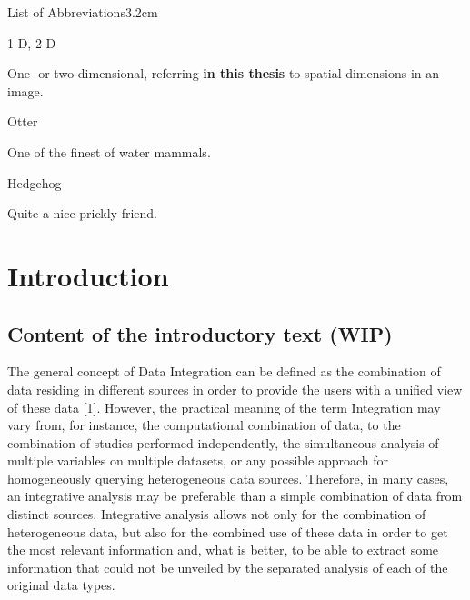 \documentclass[a4paper, nobind]{templates/ociamthesis}
\renewcommand{\chaptermark}[1]{\markboth{\thechapter. #1}{\thechapter. #1}}
\begin{document}
\begin{romanpages}
\listoftables
  \mtcaddchapter
\begin{mclistof}{List of Abbreviations}{3.2cm}

\item[1-D, 2-D]

One- or two-dimensional, referring \textbf{in this thesis} to spatial dimensions in an image.

\item[Otter]

One of the finest of water mammals.

\item[Hedgehog]

Quite a nice prickly friend.

\end{mclistof} 


\end{romanpages}

\flushbottom

\hypertarget{introduction}{%
\chapter{Introduction}\label{introduction}}

\chaptermark{Introduction}

\minitoc 

\hypertarget{content-of-the-introductory-text-wip}{%
\section{Content of the introductory text (WIP)}\label{content-of-the-introductory-text-wip}}

The general concept of Data Integration can be defined as the combination of data residing in different sources in order to provide the users with a unified view of these data {[}1{]}. However, the practical meaning of the term Integration may vary from, for instance, the computational combination of data, to the combination of studies performed independently, the simultaneous analysis of multiple variables on multiple datasets, or any possible approach for homogeneously querying heterogeneous data sources. Therefore, in many cases, an integrative analysis may be preferable than a simple combination of data from distinct sources. Integrative analysis allows not only for the combination of heterogeneous data, but also for the combined use of these data in order to get the most relevant information and, what is better, to be able to extract some information that could not be unveiled by the separated analysis of each of the original data types.
\end{document}

